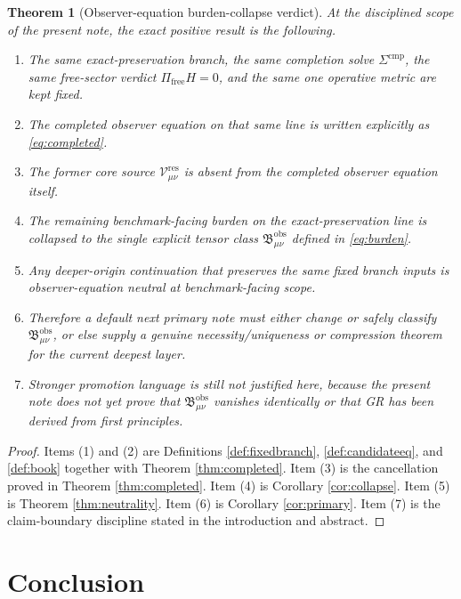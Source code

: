 \documentclass[11pt]{article}
\newcommand{\ResidualCore}{\mathcal V_{\mu\nu}^{\mathrm{res}}}
\newcommand{\ObsBurden}{\mathfrak B_{\mu\nu}^{\mathrm{obs}}}
\newtheorem{theorem}{Theorem}
\begin{document}
\begin{theorem}[Observer-equation burden-collapse verdict]
\label{thm:verdict}
At the disciplined scope of the present note, the exact positive result is the following.
\begin{enumerate}
    \item The same exact-preservation branch, the same completion solve \(\Sigma^{\mathrm{cmp}}\), the same free-sector verdict \(\Pi_{\mathrm{free}}H=0\), and the same one operative metric are kept fixed.
    \item The completed observer equation on that same line is written explicitly as \eqref{eq:completed}.
    \item The former core source \(\ResidualCore\) is absent from the completed observer equation itself.
    \item The remaining benchmark-facing burden on the exact-preservation line is collapsed to the single explicit tensor class \(\ObsBurden\) defined in \eqref{eq:burden}.
    \item Any deeper-origin continuation that preserves the same fixed branch inputs is observer-equation neutral at benchmark-facing scope.
    \item Therefore a default next primary note must either change or safely classify \(\ObsBurden\), or else supply a genuine necessity/uniqueness or compression theorem for the current deepest layer.
    \item Stronger promotion language is still not justified here, because the present note does not yet prove that \(\ObsBurden\) vanishes identically or that GR has been derived from first principles.
\end{enumerate}
\end{theorem}

\begin{proof}
Items (1) and (2) are Definitions \ref{def:fixedbranch}, \ref{def:candidateeq}, and \ref{def:book} together with Theorem \ref{thm:completed}. Item (3) is the cancellation proved in Theorem \ref{thm:completed}. Item (4) is Corollary \ref{cor:collapse}. Item (5) is Theorem \ref{thm:neutrality}. Item (6) is Corollary \ref{cor:primary}. Item (7) is the claim-boundary discipline stated in the introduction and abstract.
\end{proof}

\section{Conclusion}
\end{document}
